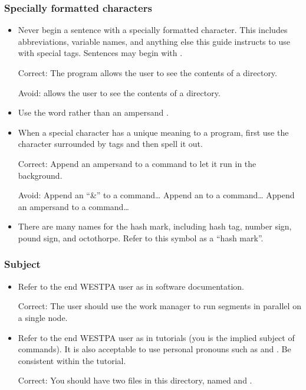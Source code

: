 \documentclass[letterpaper,10pt,english]{sphinxmanual}
\begin{document}
\subsubsection{Specially formatted characters}
\label{\detokenize{development/style_guide:specially-formatted-characters}}\begin{itemize}
\item {} 
Never begin a sentence with a specially formatted character. This includes
abbreviations, variable names, and anything else this guide instructs to use
with special tags. Sentences may begin with .

Correct: The program  allows the user to see the contents of a
directory.

Avoid:  allows the user to see the contents of a directory.

\item {} 
Use the word  rather than an \sphinxcode{\sphinxupquote{\&}} ampersand .

\item {} 
When a special character has a unique meaning to a program, first use the
character surrounded by \textasciigrave{}\textasciigrave{} tags and then spell it out.

Correct: Append an \sphinxcode{\sphinxupquote{\&}} ampersand to a command to let it run in the
background.

Avoid: Append an “\&” to a command… Append an \sphinxcode{\sphinxupquote{\&}} to a command… Append
an ampersand to a command…

\item {} 
There are many names for the \sphinxcode{\sphinxupquote{\#}} hash mark, including hash tag, number
sign, pound sign, and octothorpe. Refer to this symbol as a “hash mark”.

\end{itemize}


\subsubsection{Subject}
\label{\detokenize{development/style_guide:subject}}\begin{itemize}
\item {} 
Refer to the end WESTPA user as  in software documentation.

Correct: The user should use the  work manager to run segments
in parallel on a single node.

\item {} 
Refer to the end WESTPA user as  in tutorials (you is the implied
subject of commands). It is also acceptable to use personal pronouns such as
 and . Be consistent within the tutorial.

Correct: You should have two files in this directory, named  and
.

\end{itemize}
\end{document}
